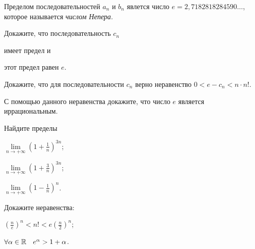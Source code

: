 \documentclass[a4paper, 12pt, num=31]{listok}
\begin{document}
\begin{definition}
    Пределом последовательностей $a_n$ и $b_n$ явлется число $e = 2{,}7182818284590\dots$, которое называется \textit{числом Непера}.
\end{definition}
\begin{problem}
    Докажите, что последовательность $c_n$
    \begin{probparts}
        \item имеет предел и 
        \item этот предел равен $e$.
    \end{probparts}
\end{problem}
\begin{problem}[\hard]
\begin{probparts}
    \item Докажите, что для последовательности $c_n$ верно неравенство $0 < e - c_n < n\cdot{n!}$.
    \item С помощью данного неравенства докажите, что число $e$ является иррациональным.
\end{probparts}
\end{problem}
\begin{problem}
    Найдите пределы
    \begin{probparts}
        \item $\lim\limits_{n \to + \infty} {\left ( 1 + \frac 1n \right )}^{3n}$;
        \item $\lim\limits_{n \to + \infty} {\left ( 1 + \frac 3n \right )}^{3n}$;
        \item $\lim\limits_{n \to + \infty} {\left ( 1 - \frac 1n \right )}^{n}$.
    \end{probparts}
\end{problem}
\begin{problem}
    Докажите неравенства:
    \begin{probparts}
        \item ${\left ( \frac n e \right )}^n < n! < e {\left ( \frac n2 \right )}^n$;
        \item $\forall{\alpha \in \R} e^\alpha > 1 + \alpha$.
    \end{probparts}
\end{problem}
\end{document}
